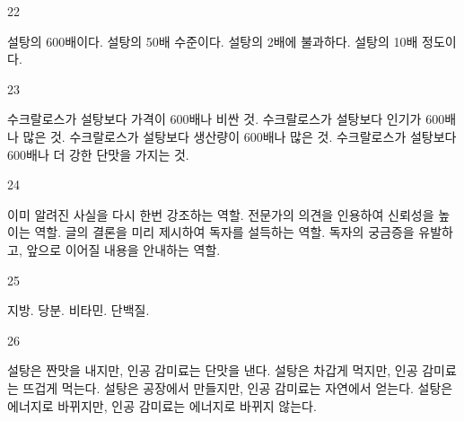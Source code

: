 \documentclass[fs9,seriesFre]{korfarm-base}
\begin{document}
\begin{kfSentenceUnit}{22}{}
\begin{kfChoices}
\kfChoice 설탕의 600배이다.
\kfChoice 설탕의 50배 수준이다.
\kfChoice 설탕의 2배에 불과하다.
\kfChoice 설탕의 10배 정도이다.
\end{kfChoices}
\end{kfSentenceUnit}

\begin{kfSentenceUnit}{23}{}
\begin{kfChoices}
\kfChoice 수크랄로스가 설탕보다 가격이 600배나 비싼 것.
\kfChoice 수크랄로스가 설탕보다 인기가 600배나 많은 것.
\kfChoice 수크랄로스가 설탕보다 생산량이 600배나 많은 것.
\kfChoice 수크랄로스가 설탕보다 600배나 더 강한 단맛을 가지는 것.
\end{kfChoices}
\end{kfSentenceUnit}

\begin{kfSentenceUnit}{24}{}
\begin{kfChoices}
\kfChoice 이미 알려진 사실을 다시 한번 강조하는 역할.
\kfChoice 전문가의 의견을 인용하여 신뢰성을 높이는 역할.
\kfChoice 글의 결론을 미리 제시하여 독자를 설득하는 역할.
\kfChoice 독자의 궁금증을 유발하고, 앞으로 이어질 내용을 안내하는 역할.
\end{kfChoices}
\end{kfSentenceUnit}

\begin{kfSentenceUnit}{25}{}
\begin{kfChoices}
\kfChoice 지방.
\kfChoice 당분.
\kfChoice 비타민.
\kfChoice 단백질.
\end{kfChoices}
\end{kfSentenceUnit}

\begin{kfSentenceUnit}{26}{}
\begin{kfChoices}
\kfChoice 설탕은 짠맛을 내지만, 인공 감미료는 단맛을 낸다.
\kfChoice 설탕은 차갑게 먹지만, 인공 감미료는 뜨겁게 먹는다.
\kfChoice 설탕은 공장에서 만들지만, 인공 감미료는 자연에서 얻는다.
\kfChoice 설탕은 에너지로 바뀌지만, 인공 감미료는 에너지로 바뀌지 않는다.
\end{kfChoices}
\end{kfSentenceUnit}
\end{document}
